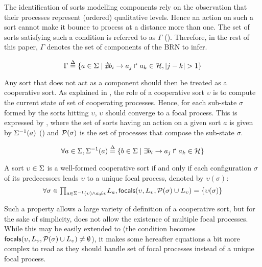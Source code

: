 The identification of sorts modelling components rely on the observation that their processes
represent (ordered) qualitative levels.
Hence an action on such a sort cannot make it bounce to process at a distance more than one.
The set of sorts satisfying such a condition is referred to as $\Gamma$
().
Therefore, in the rest of this paper, $\Gamma$ denotes the set of components of the BRN to infer.

\begin{equation}
\Gamma \stackrel{\Delta}= \{a \in \Sigma \mid \nexists b_i\rightarrow a_j\Rsh a_k \in \mathcal{H}, |j - k| > 1\} \\
\label{eq:PH-components}
\end{equation}

Any sort that does not act as a component should then be treated as a cooperative sort.
As explained in , the role of a cooperative sort $\upsilon$ is to compute the current
state of set of cooperating processes.
Hence, for each sub-state $\sigma$ formed by the sorts hitting $\upsilon$, $\upsilon$ should
converge to a focal process.
This is expressed by , where
the set of sorts having an action on a given sort $a$ is given by 
$\Sigma^{-1}(a)$ ()
and $\mathcal{P}(\sigma)$ is the set of processes that compose the sub-state $\sigma$.

\begin{equation}
\forall a \in \Sigma, \Sigma^{-1}(a) \stackrel{\Delta}= \{b \in \Sigma \mid \exists b_i\rightarrow a_j\Rsh a_k\in\mathcal{H} \}
\label{eq:ph_direct_predec}
\end{equation}

\begin{property}\label{pro:wf-cooperative-sort}
A sort $\upsilon\in\Sigma$ is a well-formed cooperative sort if and only if
each configuration $\sigma$ of its predecessors leads $\upsilon$ to a unique focal process,
denoted by $\upsilon(\sigma)$:
\[
\forall \sigma \in {\textstyle\prod_{
a\in\Sigma^{-1}(\upsilon) \wedge a\neq \upsilon}}
L_{a},
\mathsf{focals}(\upsilon,L_\upsilon,\mathcal{P}(\sigma)\cup L_\upsilon) = \{ \upsilon(\sigma) \}\]
\end{property}

Such a property allows a large variety of definition of a cooperative sort, but
for the sake of simplicity, does not allow the existence of multiple focal processes.
While this may be easily extended to (the condition becomes 
$\mathsf{focals}(\upsilon,L_\upsilon, \mathcal{P}(\sigma)\cup L_\upsilon)\neq\emptyset$), it makes some
hereafter equations a bit more complex to read as they should handle set of focal processes instead
of a unique focal process.


